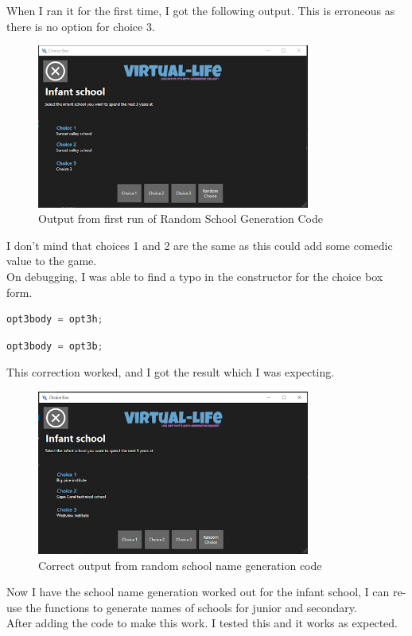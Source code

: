When I ran it for the first time, I got the following output. This is erroneous as there is no option for choice 3.
\begin{figure}[H]
    \centering
    \includegraphics[width=0.8\textwidth]{images/implementation/schoolGen1.png}
    \caption{Output from first run of Random School Generation Code}
    \label{fig:implementation-schoolGen1}
\end{figure}
\noindent I don't mind that choices 1 and 2 are the same as this could add some comedic value to the game.\\
On debugging, I was able to find a typo in the constructor for the choice box form.
\begin{lstlisting}[language=c, style=csharp, caption=Erronious line]
opt3body = opt3h;
\end{lstlisting}
\begin{lstlisting}[language=c, style=csharp, caption=Corrected line]
opt3body = opt3b;
\end{lstlisting}
This correction worked, and I got the result which I was expecting.
\begin{figure}[H]
    \centering
    \includegraphics[width=0.8\textwidth]{images/implementation/schoolGen2.png}
    \caption{Correct output from random school name generation code}
    \label{fig:implementation-schoolGen2}
\end{figure}
\noindent Now I have the school name generation worked out for the infant school, I can re-use the functions to generate names of schools for junior and secondary.\\
After adding the code to make this work. I tested this and it works as expected.

